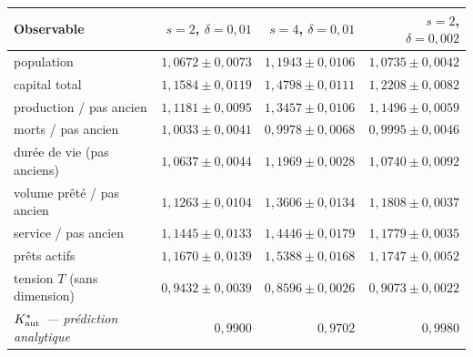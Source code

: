 \begin{center}
\begin{tabular}{@{}lrrr@{}}
\toprule
\textbf{Observable} & \textbf{$s = 2$, $\delta = 0{,}01$} & \textbf{$s = 4$, $\delta = 0{,}01$} & \textbf{$s = 2$, $\delta = 0{,}002$} \\
\midrule
population & $1{,}0672 \pm 0{,}0073$ & $1{,}1943 \pm 0{,}0106$ & $1{,}0735 \pm 0{,}0042$ \\
capital total & $1{,}1584 \pm 0{,}0119$ & $1{,}4798 \pm 0{,}0111$ & $1{,}2208 \pm 0{,}0082$ \\
production / pas ancien & $1{,}1181 \pm 0{,}0095$ & $1{,}3457 \pm 0{,}0106$ & $1{,}1496 \pm 0{,}0059$ \\
morts / pas ancien & $1{,}0033 \pm 0{,}0041$ & $0{,}9978 \pm 0{,}0068$ & $0{,}9995 \pm 0{,}0046$ \\
durée de vie (pas anciens) & $1{,}0637 \pm 0{,}0044$ & $1{,}1969 \pm 0{,}0028$ & $1{,}0740 \pm 0{,}0092$ \\
volume prêté / pas ancien & $1{,}1263 \pm 0{,}0104$ & $1{,}3606 \pm 0{,}0134$ & $1{,}1808 \pm 0{,}0037$ \\
service / pas ancien & $1{,}1445 \pm 0{,}0133$ & $1{,}4446 \pm 0{,}0179$ & $1{,}1779 \pm 0{,}0035$ \\
prêts actifs & $1{,}1670 \pm 0{,}0139$ & $1{,}5388 \pm 0{,}0168$ & $1{,}1747 \pm 0{,}0052$ \\
tension $T$ (sans dimension) & $0{,}9432 \pm 0{,}0039$ & $0{,}8596 \pm 0{,}0026$ & $0{,}9073 \pm 0{,}0022$ \\
\midrule
\emph{$K^{*}_{\mathrm{aut}}$ --- prédiction analytique} & $\mathit{0{,}9900}$ & $\mathit{0{,}9702}$ & $\mathit{0{,}9980}$ \\
\bottomrule
\end{tabular}
\end{center}
